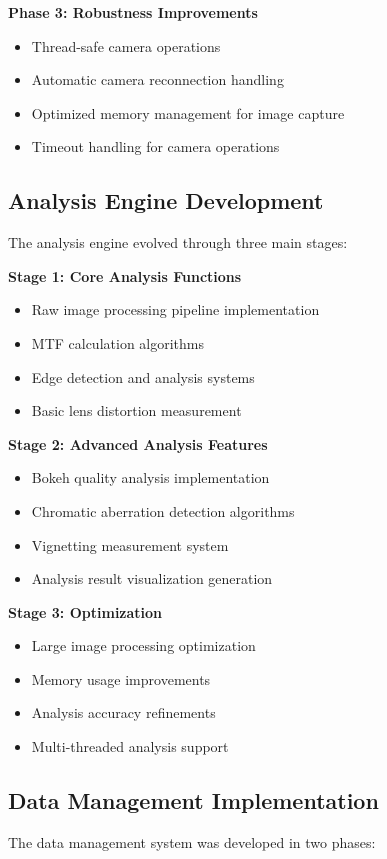 \textbf{Phase 3: Robustness Improvements}
\begin{itemize}
    \item Thread-safe camera operations
    \item Automatic camera reconnection handling
    \item Optimized memory management for image capture
    \item Timeout handling for camera operations
\end{itemize}

\subsection{Analysis Engine Development}
The analysis engine evolved through three main stages:

\textbf{Stage 1: Core Analysis Functions}
\begin{itemize}
    \item Raw image processing pipeline implementation
    \item MTF calculation algorithms
    \item Edge detection and analysis systems
    \item Basic lens distortion measurement %
\end{itemize}

\textbf{Stage 2: Advanced Analysis Features}
\begin{itemize}
    \item Bokeh quality analysis implementation
    \item Chromatic aberration detection algorithms
    \item Vignetting measurement system
    \item Analysis result visualization generation
\end{itemize}

\textbf{Stage 3: Optimization}
\begin{itemize}
    \item Large image processing optimization
    \item Memory usage improvements
    \item Analysis accuracy refinements
    \item Multi-threaded analysis support
\end{itemize}

\subsection{Data Management Implementation}
The data management system was developed in two phases:


